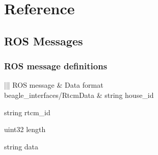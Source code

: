 \documentclass[letterpaper,10pt,english]{sphinxmanual}
\begin{document}
\chapter{Reference}
\label{\detokenize{source/reference:reference}}\label{\detokenize{source/reference::doc}}
\begin{landscape}


\section{ROS Messages}
\label{\detokenize{source/ros_messages:ros-messages}}\label{\detokenize{source/ros_messages::doc}}

\subsection{ROS message definitions}
\label{\detokenize{source/ros_messages:ros-message-definitions}}

\begin{savenotes}\sphinxattablestart
\centering
{}
\sphinxthecaptionisattop
{}\label{\detokenize{source/ros_messages:id1}}
\sphinxaftertopcaption
\begin{tabular}[t]{|||}
\hline
\sphinxstyletheadfamily 
ROS message
&\sphinxstyletheadfamily 
Data format
\\
\hline
beagle\_interfaces/RtcmData
&\label{\detokenize{source/ros_messages:beagle-interfaces-msg-rtcmdata}}
string house\_id

string rtcm\_id

uint32 length

string data
\\
\hline
\end{tabular}
\par
\sphinxattableend\end{savenotes}

\end{landscape}
\end{document}
